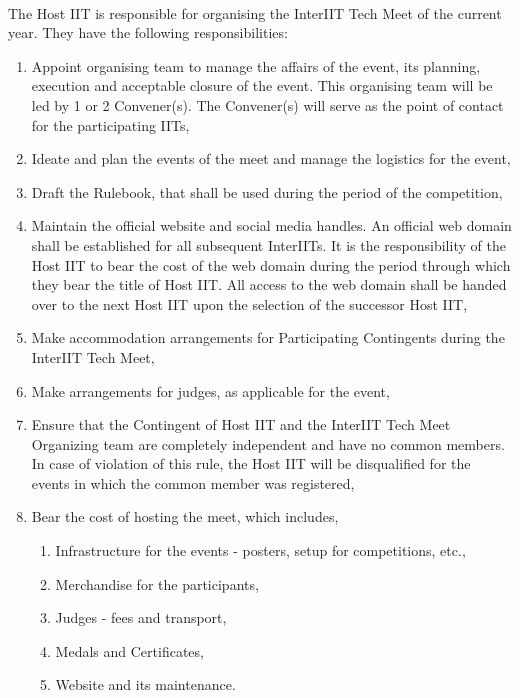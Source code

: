 \paragraph{}
The Host IIT is responsible for organising the InterIIT Tech Meet of the current year. They have the following responsibilities:
\begin{enumerate}
    \item Appoint organising team to manage the affairs of the event, its planning, execution and acceptable closure of the event. This organising team will be led by 1 or 2 Convener(s). The Convener(s) will serve as the point of contact for the participating IITs,
    \item Ideate and plan the events of the meet and manage the logistics for the event,
    \item Draft the Rulebook, that shall be used during the period of the competition,
    \item Maintain the official website and social media handles. An official web domain shall be established for all subsequent InterIITs. It is the responsibility of the Host IIT to bear the cost of the web domain during the period through which they bear the title of Host IIT. All access to the web domain shall be handed over to the next Host IIT upon the selection of the successor Host IIT,
    \item Make accommodation arrangements for Participating Contingents during the InterIIT Tech Meet,
    \item Make arrangements for judges, as applicable for the event,
    \item Ensure that the Contingent of Host IIT and the InterIIT Tech Meet Organizing team are completely independent and have no common members. In case of violation of this rule, the Host IIT will be disqualified for the events in which the common member was registered,
    \item Bear the cost of hosting the meet, which includes,
    \begin{enumerate}
        \item Infrastructure for the events - posters, setup for competitions, etc.,
        \item Merchandise for the participants,
        \item Judges - fees and transport,
        \item Medals and Certificates,
        \item Website and its maintenance.
    \end{enumerate}
\end{enumerate}

